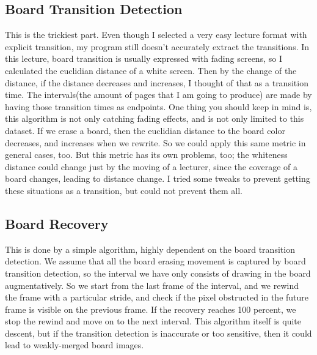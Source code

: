 \documentclass[a4paper]{article}
\begin{document}
\subsection{Board Transition Detection}
This is the trickiest part. Even though I selected a very easy lecture format with explicit transition, my program still doesn't accurately extract the transitions. In this lecture, board transition is usually expressed with fading screens, so I calculated the euclidian distance of a white screen. Then by the change of the distance, if the distance decreases and increases, I thought of that as a transition time. The intervals(the amount of pages that I am going to produce) are made by having those transition times as endpoints. One thing you should keep in mind is, this algorithm is not only catching fading effects, and is not only limited to this dataset. If we erase a board, then the euclidian distance to the board color decreases, and increases when we rewrite. So we could apply this same metric in general cases, too. But this metric has its own problems, too; the whiteness distance could change just by the moving of a lecturer, since the coverage of a board changes, leading to distance change. I tried some tweaks to prevent getting these situations as a transition, but could not prevent them all.
\subsection{Board Recovery}
This is done by a simple algorithm, highly dependent on the board transition detection. We assume that all the board erasing movement is captured by board transition detection, so the interval we have only consists of drawing in the board augmentatively. So we start from the last frame of the interval, and we rewind the frame with a particular stride, and check if the pixel obstructed in the future frame is visible on the previous frame. If the recovery reaches 100 percent, we stop the rewind and move on to the next interval. This algorithm itself is quite descent, but if the transition detection is inaccurate or too sensitive, then it could lead to weakly-merged board images.
\begin{figure}[H]
\centering
{}
\end{figure}
\end{document}
